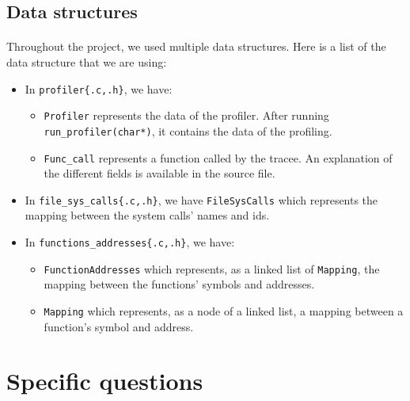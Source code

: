 \documentclass[a4paper, 11pt, oneside]{article}
\begin{document}
\subsection{Data structures}
\paragraph{}Throughout the project, we used multiple data structures. Here is a list of the data structure that we are using:
\begin{itemize}
	\item In \texttt{profiler\{.c,.h\}}, we have:
		\begin{itemize}
			\item \texttt{Profiler} represents the data of the profiler. After running \texttt{run\_profiler(char*)}, it contains the data of the profiling.
			\item \texttt{Func\_call} represents a function called by the tracee. An explanation of the different fields is available in the source file.
		\end{itemize}
	\item In \texttt{file\_sys\_calls\{.c,.h\}}, we have \texttt{FileSysCalls} which represents the mapping between the system calls' names and ids.
	\item In \texttt{functions\_addresses\{.c,.h\}}, we have:
		\begin{itemize}
			\item \texttt{FunctionAddresses} which represents, as a linked list of \texttt{Mapping}, the mapping between the functions' symbols and addresses.
			\item \texttt{Mapping} which represents, as a node of a linked list, a mapping between a function's symbol and address.
		\end{itemize}
\end{itemize}

\section{Specific questions}
\end{document}
